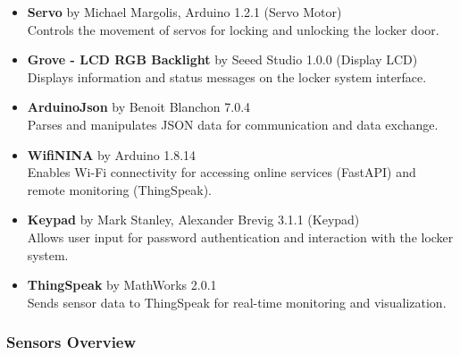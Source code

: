 \begin{itemize}
    \item \textbf{Servo} by Michael Margolis, Arduino 1.2.1 (Servo Motor) \\ Controls the movement of servos for locking and unlocking the locker door.
    \item \textbf{Grove - LCD RGB Backlight} by Seeed Studio 1.0.0 (Display LCD) \\ Displays information and status messages on the locker system interface.
    \item \textbf{ArduinoJson} by Benoit Blanchon 7.0.4 \\ Parses and manipulates JSON data for communication and data exchange.
    \item \textbf{WifiNINA} by Arduino 1.8.14 \\ Enables Wi-Fi connectivity for accessing online services (FastAPI) and remote monitoring (ThingSpeak).
    \item \textbf{Keypad} by Mark Stanley, Alexander Brevig 3.1.1 (Keypad) \\ Allows user input for password authentication and interaction with the locker system.
    \item \textbf{ThingSpeak} by MathWorks 2.0.1 \\ Sends sensor data to ThingSpeak for real-time monitoring and visualization.
\end{itemize}


\newpage

\subsubsection{Sensors Overview}\label{sec:ArduinoSensors}

